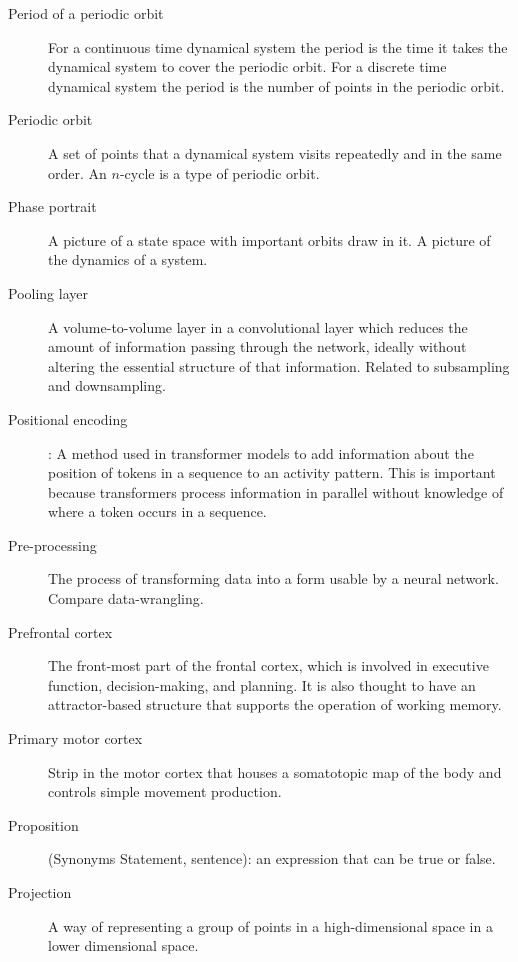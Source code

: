 \begin{description}
\item[Period of a periodic orbit] For a continuous time dynamical system the period is the time it takes the dynamical system to cover the periodic orbit. For a discrete time dynamical system the period is the number of points in the periodic orbit.

\item[Periodic orbit] A set of points that a dynamical system visits repeatedly and in the same order. An $n$-cycle is a type of periodic orbit.

\item[Phase portrait] A picture of a state space with important orbits draw in it. A picture of the dynamics of a system.

\item[Pooling layer] A volume-to-volume layer in a convolutional layer which reduces the amount of information passing through the network, ideally without altering the essential structure of that information. Related to subsampling and downsampling. 

\item[Positional encoding]: A method used in transformer models to add information about the position of tokens in a sequence to an activity pattern. This is important because transformers process information in parallel without knowledge of where a token occurs in a sequence.

\item[Pre-processing] The process of transforming data into a form usable by a neural network. Compare data-wrangling.


\item[Prefrontal cortex] The front-most part of the frontal cortex, which is involved in executive function, decision-making, and planning. It is also thought to have an attractor-based structure that supports the operation of working memory.

\item[Primary motor cortex] Strip in the motor cortex that houses a somatotopic map of the body and controls simple movement production. 

\item[Proposition] (Synonyms Statement, sentence): an expression that can be true or false.

\item[Projection] A way of representing a group of points in a high-dimensional space in a lower dimensional space.


\end{description}
